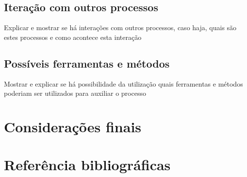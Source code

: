 \documentclass{article}
\begin{document}
	\subsection{Iteração com outros processos}		
		Explicar e mostrar se há interações com outros processos, caso haja, quais são estes processos e como acontece esta interação
	
	\subsection{Possíveis ferramentas e métodos}
		Mostrar e explicar se há possibilidade da utilização quais ferramentas e métodos poderiam ser utilizados para auxiliar o processo


	
\section{Considerações finais}

\section{Referência bibliográficas}
\end{document}
